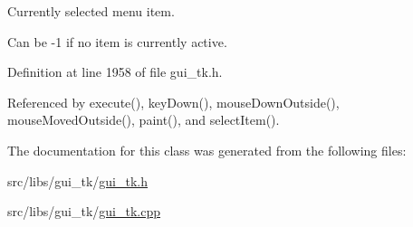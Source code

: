 Currently selected menu item. 

Can be -\/1 if no item is currently active. 

Definition at line 1958 of file gui\-\_\-tk.\-h.



Referenced by execute(), key\-Down(), mouse\-Down\-Outside(), mouse\-Moved\-Outside(), paint(), and select\-Item().



The documentation for this class was generated from the following files\-:\begin{DoxyCompactItemize}
\item 
src/libs/gui\-\_\-tk/\hyperlink{gui__tk_8h}{gui\-\_\-tk.\-h}\item 
src/libs/gui\-\_\-tk/\hyperlink{gui__tk_8cpp}{gui\-\_\-tk.\-cpp}\end{DoxyCompactItemize}
